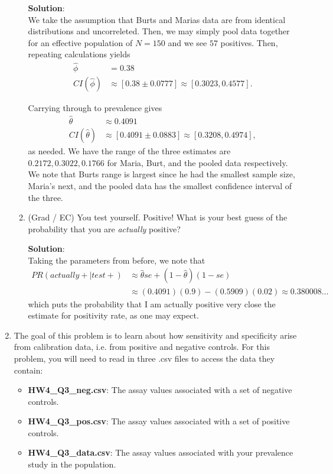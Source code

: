 \documentclass[11pt]{article}
\begin{document}
\begin{enumerate}
\begin{enumerate}[label=\alph*.]
	\begin{tcolorbox}[breakable]
		\textbf{Solution}:\\
		We take the assumption that Burts and Marias data are from identical distributions and uncorreleted. Then, we may simply pool data together for an effective population of $N=150$ and we see $57$ positives. Then, repeating calculations yields
		\begin{align*}
			\hat{\phi} &=0.38\\
			CI(\hat{\phi}) &\approx [0.38\pm 0.0777] \approx [0.3023, 0.4577].
		\end{align*}
		
		Carrying through to prevalence gives
		\begin{align*}
			\hat{\theta}&\approx 0.4091\\
			CI(\hat{\theta})&\approx [0.4091\pm 0.0883] \approx [0.3208,0.4974],
		\end{align*}
		as needed. We have the range of the three estimates are $0.2172, 0.3022, 0.1766$ for Maria, Burt, and the pooled data respectively. We note that Burts range is largest since he had the smallest sample size, Maria's next, and the pooled data has the smallest confidence interval of the three.
	\end{tcolorbox}
	
	\item (Grad / EC) You test yourself. Positive! What is your best guess of the probability that you are {\it actually} positive?
	
	\begin{tcolorbox}[breakable]
		\textbf{Solution}:\\
		Taking the parameters from before, we note that 
		\begin{align*}
			PR(actually +|test +) &\approx \hat{\theta}se + (1-\hat{\theta})(1-se) \\
			&\approx (0.4091)(0.9)-(0.5909)(0.02) \approx 0.380008\ldots
		\end{align*}
		which puts the probability that I am actually positive very close the estimate for positivity rate, as one may expect.
	\end{tcolorbox}
	
\end{enumerate}

\clearpage

\item The goal of this problem is to learn about how sensitivity and specificity arise from calibration data, i.e. from positive and negative controls. For this problem, you will need to read in three .csv files to access the data they contain:
\begin{itemize}
	\item {\bf HW4\_Q3\_neg.csv}: The assay values associated with a set of negative controls. 
	\item {\bf HW4\_Q3\_pos.csv}: The assay values associated with a set of positive controls. 
	\item {\bf HW4\_Q3\_data.csv}: The assay values associated with your prevalence study in the population.
\end{itemize}
\vspace{0.5in}


\end{enumerate}
\end{document}
